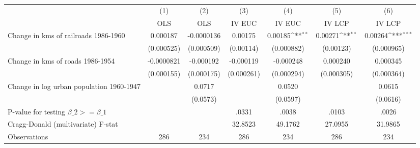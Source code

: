 {
\def\sym#1{\ifmmode^{#1}\else\(^{#1}\)\fi}
\begin{tabular}{l*{6}{c}}
\hline\hline
                &\multicolumn{1}{c}{(1)}&\multicolumn{1}{c}{(2)}&\multicolumn{1}{c}{(3)}&\multicolumn{1}{c}{(4)}&\multicolumn{1}{c}{(5)}&\multicolumn{1}{c}{(6)}\\
                &\multicolumn{1}{c}{OLS}&\multicolumn{1}{c}{OLS}&\multicolumn{1}{c}{IV EUC}&\multicolumn{1}{c}{IV EUC}&\multicolumn{1}{c}{IV LCP}&\multicolumn{1}{c}{IV LCP}\\
\hline
Change in kms of railroads 1986-1960& 0.000187         &-0.0000136         &  0.00175         &  0.00185\sym{**} &  0.00271\sym{**} &  0.00264\sym{***}\\
                &(0.000525)         &(0.000509)         &(0.00114)         &(0.000882)         &(0.00123)         &(0.000965)         \\
[1em]
Change in kms of roads 1986-1954&-0.0000821         &-0.000192         &-0.000119         &-0.000248         & 0.000240         & 0.000345         \\
                &(0.000155)         &(0.000175)         &(0.000261)         &(0.000294)         &(0.000305)         &(0.000364)         \\
[1em]
Change in log urban population 1960-1947&                  &   0.0717         &                  &   0.0520         &                  &   0.0615         \\
                &                  & (0.0573)         &                  & (0.0597)         &                  & (0.0616)         \\
\hline
P-value for testing $\beta\_{2} >= \beta\_{1}$&                  &                  &    .0331         &    .0038         &    .0103         &    .0026         \\
Cragg-Donald (multivariate) F-stat&                  &                  &  32.8523         &  49.1762         &  27.0955         &  31.9865         \\
Observations    &      286         &      234         &      286         &      234         &      286         &      234         \\
\hline\hline
\end{tabular}
}
